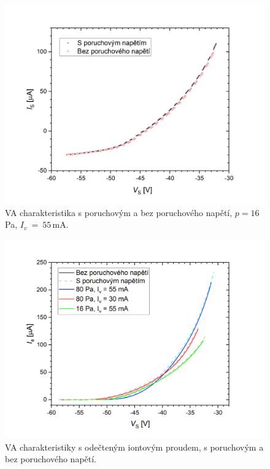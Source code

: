 \documentclass[a4paper,12pt]{article}
\begin{document}
\begin{figure}[h!]
	\centering
	\includegraphics[width=135mm]{demonstracni.png}
	\caption{VA charakteristika s poruchovým a 
		bez poruchového napětí, $p=16$\,\si{\pascal}, 
		$I_v~=~55$\,\si{\milli\ampere}.}
	\label{demonstracni}
\end{figure}

\begin{figure}[h!]
	\centering
	\includegraphics[width=135mm]{Ieporucha.png}
	\caption{VA charakteristiky s odečteným iontovým proudem, s poruchovým a 
	bez poruchového napětí.}
	\label{Ieporucha}
\end{figure}
\end{document}
